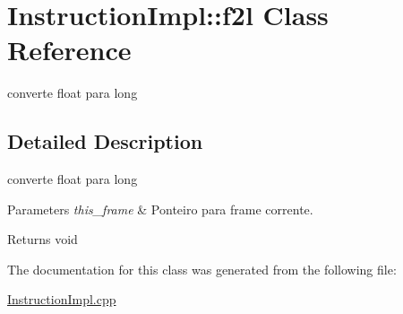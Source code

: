 \hypertarget{class_instruction_impl_1_1f2l}{}\section{Instruction\+Impl\+:\+:f2l Class Reference}
\label{class_instruction_impl_1_1f2l}


converte float para long  




\subsection{Detailed Description}
converte float para long 


\begin{DoxyParams}{Parameters}
{\em this\+\_\+frame} & Ponteiro para frame corrente. \\
\hline
\end{DoxyParams}
\begin{DoxyReturn}{Returns}
void 
\end{DoxyReturn}


The documentation for this class was generated from the following file\+:\begin{DoxyCompactItemize}
\item 
\hyperlink{_instruction_impl_8cpp}{Instruction\+Impl.\+cpp}\end{DoxyCompactItemize}
